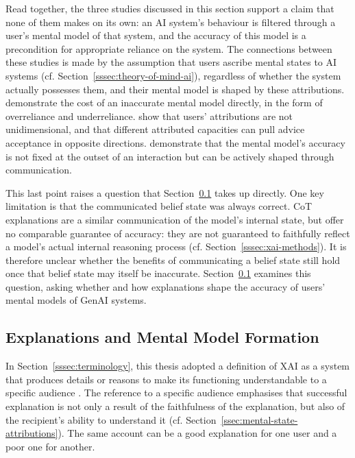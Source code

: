 Read together, the three studies discussed in this section support a claim that none of them makes on its own: an \ac{AI} system's behaviour is filtered through a user's mental model of that system, and the accuracy of this model is a precondition for appropriate reliance on the system. The connections between these studies is made by the assumption that users ascribe mental states to \ac{AI} systems (cf. Section~\ref{sssec:theory-of-mind-ai}), regardless of whether the system actually possesses them, and their mental model is shaped by these attributions. \textcite{Jussupow2021} demonstrate the cost of an inaccurate mental model directly, in the form of overreliance and underreliance. \textcite{Colombatto2025} show that users' attributions are not unidimensional, and that different attributed capacities can pull advice acceptance in opposite directions. \textcite{Ying2024} demonstrate that the mental model's accuracy is not fixed at the outset of an interaction but can be actively shaped through communication.

This last point raises a question that Section~\ref{ssec:explanations-mental-model-formation} takes up directly. \textcite{Ying2024} One key limitation is that the communicated belief state was always correct. \ac{CoT} explanations are a similar communication of the model's internal state, but offer no comparable guarantee of accuracy: they are not guaranteed to faithfully reflect a model's actual internal reasoning process \parencite{Lyu2023} (cf. Section~\ref{sssec:xai-methods}). It is therefore unclear whether the benefits of communicating a belief state still hold once that belief state may itself be inaccurate. Section~\ref{ssec:explanations-mental-model-formation} examines this question, asking whether and how explanations shape the accuracy of users' mental models of \ac{GenAI} systems.

\subsection{Explanations and Mental Model Formation} \label{ssec:explanations-mental-model-formation}

In Section~\ref{sssec:terminology}, this thesis adopted a definition of \ac{XAI} as a system that produces details or reasons to make its functioning understandable to a specific audience \parencite{Arrieta2020}. The reference to a specific audience emphasises that successful explanation is not only a result of the faithfulness of the explanation, but also of the recipient's ability to understand it (cf. Section~\ref{ssec:mental-state-attributions}). The same account can be a good explanation for one user and a poor one for another.

